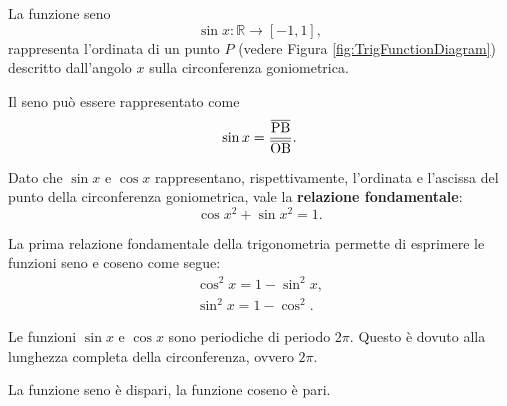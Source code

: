 \begin{definition}[Seno]
    La funzione seno
    \begin{equation*}
        \sin x\colon \mathbb R\rightarrow[-1,1],
    \end{equation*}
    rappresenta l'\gls{ordinata} di un punto $P$ (vedere Figura \ref{fig:TrigFunctionDiagram}) descritto dall'angolo $x$ sulla circonferenza goniometrica.
\end{definition}

\begin{proposition}
    Il seno può essere rappresentato come
    \begin{equation*}
        \sin x=\frac{\overline{\rm PB}}{\overline{\rm OB}}.
    \end{equation*}
\end{proposition}

\begin{property}\label{def:prima_relazione_fondamentale_goniometria}
    Dato che $\sin x$ e $\cos x$ rappresentano, rispettivamente, l'ordinata e l'ascissa del punto della circonferenza goniometrica, vale la \textbf{relazione fondamentale}:
    \begin{equation}
        \cos{x}^2+\sin{x}^2 = 1.
    \end{equation}
\end{property}

\begin{definition}
    La prima relazione fondamentale della trigonometria permette di esprimere le funzioni seno e coseno come segue:
    \begin{equation}\label{eq:prima_relazione_fondamentale_goniometria}
        \begin{matrix}
            \cos^2x=1-\sin^2x,\\
            \sin^2x=1-\cos^2.
        \end{matrix}
    \end{equation}
\end{definition}

\begin{property}
    Le funzioni $\sin x$ e $\cos x$ sono periodiche di periodo $2\pi$. Questo è dovuto alla lunghezza completa della circonferenza, ovvero $2\pi$.
\end{property}

\begin{property}
    La funzione seno è dispari, la funzione coseno è pari.
\end{property}

